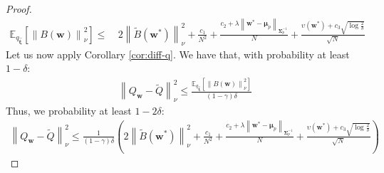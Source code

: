 \documentclass{article}
\newcommand{\wt}[1]{\widetilde{#1}}
\newcommand{\wh}[1]{\widehat{#1}}
\newcommand{\norm}[1]{\left\lVert #1 \right\rVert}
\begin{document}
\begin{proof}
\begin{align*}
\mathbb{E}_{q_{\wh{\bm{\xi}}}}\left[ \norm{B(\bm{w})}_{\nu}^2 \right ] \leq\ & 2\norm{\wt{B}(\bm{w}^{*})}_{\nu}^2 + \frac{c_1}{N^2} + \frac{c_2 + \lambda\norm{\bm{w}^* - \bm{\mu}_p}_{\bm{\Sigma}_p^{-1}}}{N} + \frac{\upsilon(\bm{w}^*) + c_3\sqrt{\log\frac{2}{\delta}}}{\sqrt{N}}
\end{align*}
Let us now apply Corollary \ref{cor:diff-q}. We have that, with probability at least $1-\delta$:
\begin{align*}
\norm{Q_{\bm{w}} - \wt{Q}}_{\nu}^2 \leq \frac{\mathbb{E}_{q_{\wh{\bm{\xi}}}}\left[ \norm{B(\bm{w})}_{\nu}^2 \right ]}{(1-\gamma)\delta}
\end{align*}
Thus, we probability at least $1-2\delta$:
\begin{align*}
\norm{Q_{\bm{w}} - \wt{Q}}_{\nu}^2 \leq \frac{1}{(1-\gamma)\delta}\left(2\norm{\wt{B}(\bm{w}^{*})}_{\nu}^2 + \frac{c_1}{N^2} + \frac{c_2 + \lambda\norm{\bm{w}^* - \bm{\mu}_p}_{\bm{\Sigma}_p^{-1}}}{N} + \frac{\upsilon(\bm{w}^*) + c_3\sqrt{\log\frac{2}{\delta}}}{\sqrt{N}}\right)
\end{align*}
\end{proof}
\end{document}
